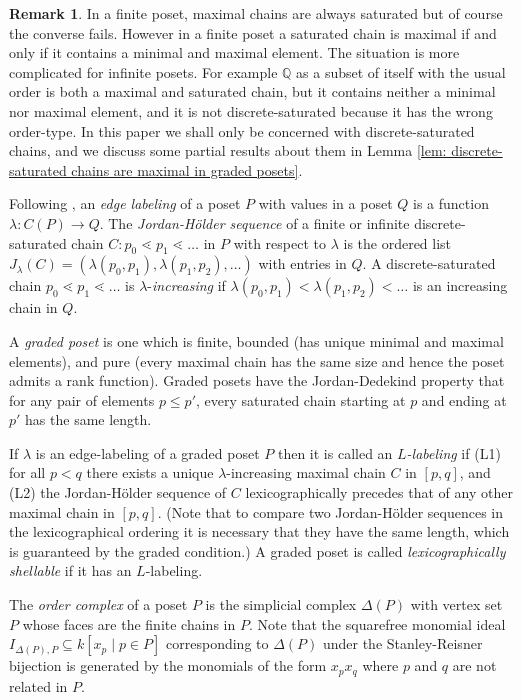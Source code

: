 \documentclass[oneside,11pt,reqno]{amsart}
\newcommand{\qq}{\ensuremath{\mathbb{Q}}}
\theoremstyle{definition}
\newtheorem{remark}{Remark}
\newtheorem{proof techniques}{Proof Techniques}
\begin{document}
\begin{remark}
    In a finite poset, maximal chains are always saturated but of course the converse fails. However in a finite poset a saturated chain is maximal if and only if it contains a minimal and maximal element. The situation is more complicated for infinite posets. For example $\qq$ as a subset of itself with the usual order is both a maximal and saturated chain, but it contains neither a minimal nor maximal element, and it is not discrete-saturated because it has the wrong order-type. In this paper we shall only be concerned with discrete-saturated chains, and we discuss some partial results about them in Lemma \ref{lem: discrete-saturated chains are maximal in graded posets}. 
\end{remark} 

Following \cite{bjorner1980shellable}, an \emph{edge labeling} of a poset $P$ with values in a poset $Q$ is a function $\lambda: C(P) \to Q$. The \emph{Jordan-H\"{o}lder sequence} of a finite or infinite discrete-saturated chain $C: p_0 \lessdot p_1 \lessdot \ldots$ in $P$ with respect to $\lambda$ is the ordered list $J_\lambda(C) = (\lambda(p_0, p_1) , \lambda(p_1, p_2) , \ldots )$ with entries in $Q$. A discrete-saturated chain $p_0 \lessdot p_1 \lessdot \ldots$ is $\lambda$-\emph{increasing} if $\lambda(p_0 , p_1) < \lambda(p_1, p_2) < \ldots$ is an increasing chain in $Q$. 

A \emph{graded poset} is one which is finite, bounded (has unique minimal and maximal elements), and pure (every maximal chain has the same size and hence the poset admits a rank function). Graded posets have the Jordan-Dedekind property that for any pair of elements $p \leq p'$, every saturated chain starting at $p$ and ending at $p'$ has the same length. 

If $\lambda$ is an edge-labeling of a graded poset $P$ then it is called an \emph{$L$-labeling} if (L1) for all $p < q$ there exists a unique $\lambda$-increasing maximal chain $C$ in $[p , q]$, and (L2) the Jordan-H\"{o}lder sequence of $C$ lexicographically precedes that of any other maximal chain in $[p , q]$. (Note that to compare two Jordan-H\"{o}lder sequences in the lexicographical ordering it is necessary that they have the same length, which is guaranteed by the graded condition.) A graded poset is called \emph{lexicographically shellable} if it has an $L$-labeling. 

The \emph{order complex} of a poset $P$ is the simplicial complex $\Delta(P)$ with vertex set $P$ whose faces are the finite chains in $P$. Note that the squarefree monomial ideal $I_{\Delta(P) , P} \subseteq k[x_p \mid p \in P]$ corresponding to $\Delta(P)$ under the Stanley-Reisner bijection is generated by the monomials of the form $x_p x_q$ where $p$ and $q$ are not related in $P$. 
\end{document}
